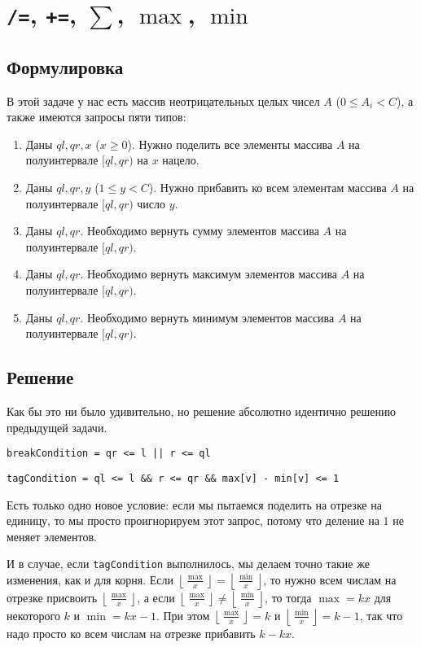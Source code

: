 \cprotect \section{\verb+/=+, \verb^+=^, $\sum$, $\max$, $\min$}

\subsection{Формулировка}

В этой задаче у нас есть массив неотрицательных целых чисел $A$ ($0 \le A_i < C$), а также имеются запросы пяти типов:

\begin{enumerate}
    \item Даны $ql, qr, x$ ($x \ge 0$). Нужно поделить все элементы массива $A$ на полуинтервале $[ql, qr)$ на $x$ нацело.
    \item Даны $ql, qr, y$ ($1 \le y < C$). Нужно прибавить ко всем элементам массива $A$ на полуинтервале $[ql, qr)$ число $y$.
    \item Даны $ql, qr$. Необходимо вернуть сумму элементов массива $A$ на полуинтервале $[ql, qr)$.
    \item Даны $ql, qr$. Необходимо вернуть максимум элементов массива $A$ на полуинтервале $[ql, qr)$.
    \item Даны $ql, qr$. Необходимо вернуть минимум элементов массива $A$ на полуинтервале $[ql, qr)$.
\end{enumerate}

\subsection{Решение}

Как бы это ни было удивительно, но решение абсолютно идентично решению предыдущей задачи.

\verb+breakCondition = qr <= l || r <= ql+

\verb+tagCondition = ql <= l && r <= qr && max[v] - min[v] <= 1+

Есть только одно новое условие: если мы пытаемся поделить на отрезке на единицу, то мы просто проигнорируем этот запрос, потому что деление на $1$ не меняет элементов.

И в случае, если \verb+tagCondition+ выполнилось, мы делаем точно такие же изменения, как и для корня. Если $\left\lfloor \frac{\max}{x} \right\rfloor = \left\lfloor \frac{\min}{x} \right\rfloor$, то нужно всем числам на отрезке присвоить $\left\lfloor \frac{\max}{x} \right\rfloor$, а если $\left\lfloor \frac{\max}{x} \right\rfloor \neq \left\lfloor \frac{\min}{x} \right\rfloor$, то тогда $\max = kx$ для некоторого $k$ и $\min = kx - 1$. При этом $\left\lfloor \frac{\max}{x} \right\rfloor = k$ и $\left\lfloor \frac{\min}{x} \right\rfloor = k - 1$, так что надо просто ко всем числам на отрезке прибавить $k - kx$.

